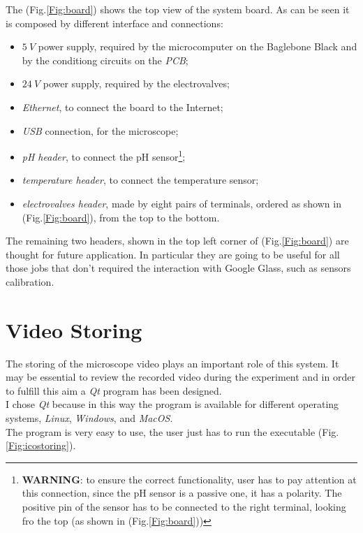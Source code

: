 The (Fig.\ref{Fig:board}) shows the top view of the system board. As can be seen it is composed by different interface and connections:
\begin{itemize}
	\item $5\ V$ power supply, required by the microcomputer on the Baglebone Black and by the conditiong circuits on the \textit{PCB};
	\item $24\ V$ power supply, required by the electrovalves;
	\item \textit{Ethernet}, to connect the board to the Internet;
	\item \textit{USB} connection, for the microscope;
	\item \textit{pH header}, to connect the pH sensor\footnote{\textbf{WARNING}: to ensure the correct functionality, user has to pay attention at this connection, since the pH sensor is a passive one, it has a polarity. The positive pin of the sensor has to be connected to the right terminal, looking fro the top (as shown in (Fig.\ref{Fig:board}))};
	\item \textit{temperature header}, to connect the temperature sensor;
	\item \textit{electrovalves header}, made by eight pairs of terminals, ordered as shown in (Fig.\ref{Fig:board}), from the top to the bottom.
\end{itemize}

The remaining two headers, shown in the top left corner of (Fig.\ref{Fig:board}) are thought for future application. In particular they are going to be useful for all those jobs that don't required the interaction with Google Glass, such as sensors calibration.

\section*{Video Storing}
The storing of the microscope video plays an important role of this system. It may be essential to review the recorded video  during the experiment and in order to fulfill this aim a \textit{Qt} program has been designed.\\
I chose \textit{Qt} because in this way the program is available for different operating systems, \textit{Linux}, \textit{Windows}, and \textit{MacOS}.\\

The program is very easy to use, the user just has to run the executable (Fig.\ref{Fig:icostoring}).

